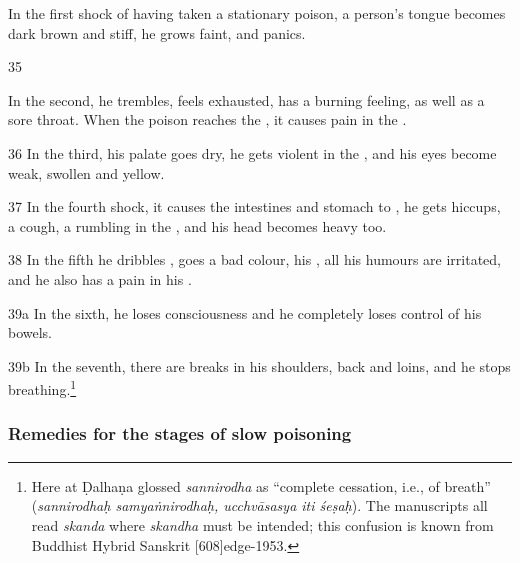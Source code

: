 \begin{translation}
    In the first shock of having taken a stationary poison, a person's tongue 
    becomes dark brown and stiff, he grows faint, and panics.
    
    \item[35]
    
    In the second, he trembles, feels exhausted, has a burning
feeling, as well as a sore throat.  When the poison reaches the
, it causes pain in the .
    
    
    
    \item[36]
    In the third, his palate goes dry, he gets violent  in the 
    , and his eyes become weak, swollen and yellow.

    \item[37]
    In the fourth shock, it causes the intestines and stomach to
    , he gets hiccups, a cough,  a rumbling in the
    , and his head becomes heavy too.
    
     \item[38]
    In the fifth he dribbles , goes a bad colour,
    his ,  all his humours are irritated, and he
    also has a pain in his .
   
   
    \item[39a]
    In the sixth, he loses consciousness and he completely loses
    control of his bowels.
    
    \item[39b]
    In the seventh, there are breaks in his shoulders, back and loins, and he  
stops breathing.\footnote{%
Here at  Ḍalhaṇa glossed \emph{sannirodha} as
“complete cessation, i.e., of breath” (\emph{sannirodhaḥ 
samyaṅnirodhaḥ, ucchvāsasya iti śeṣaḥ}).
The manuscripts all read \emph{skanda} where \emph{skandha} must be 
intended; this confusion is known from Buddhist Hybrid Sanskrit 
[608]{edge-1953}.}
    
    
    
\subsubsection{Remedies for the stages of slow poisoning}
  \label{dusivisa}
  

\end{translation}
